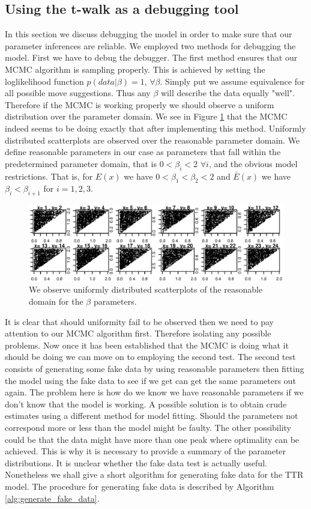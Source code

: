 \documentclass[paper=a4, fontsize=11pt]{scrartcl}
\numberwithin{equation}{section}		%
\numberwithin{figure}{section}			%
\numberwithin{table}{section}				%
\begin{document}
\subsection{Using the t-walk as a debugging tool}
In this section we discuss debugging the model in order to make sure that our parameter inferences are reliable. We employed two methods for debugging the model. First we have to debug the debugger. The first method ensures that our MCMC algorithm is sampling properly. This is achieved by setting the loglikelihood function $p(data|\beta) = 1$, $\forall \beta$. Simply put we assume equivalence for all possible move suggestions. Thus any $\beta$ will describe the data equally "well". Therefore if the MCMC is working properly we should observe a uniform distribution over the parameter domain.  We see in Figure \ref{fig:mcmc_debug_uni_dist} that the MCMC indeed seems to be doing exactly that after implementing this method.  Uniformly distributed scatterplots are observed over the reasonable parameter domain. 
We define reasonable parameters in our case as parameters that fall within the predetermined parameter domain, that is $ 0 <\beta_i < 2$  $\forall i$, and the obvious model restrictions. That is,  for $E(x)$ we have $0 <\beta_1 < \beta_2 < 2$ and $\bar{E}(x)$ we have $\beta_{i} < \beta_{i+1}$ for $i = 1,2,3$.
\begin{figure}[ht]
\centering
\includegraphics[scale=0.8]{mcmc_debug.eps}
\caption{We observe uniformly distributed scatterplots of the reasonable domain for the $\beta$ parameters.} 
\label{fig:mcmc_debug_uni_dist}
\end{figure}

It is clear that should uniformity fail to be observed then we need to pay attention to our MCMC algorithm first. Therefore isolating any possible problems.
Now once it has been established that the MCMC is doing what it should be doing we can move on to employing the second test. The second test consists of generating some fake data by using reasonable parameters then fitting the model using the fake data to see if we get can get the same parameters out again. The problem here is how do we know we have reasonable parameters if we don't know that the model is working. A possible solution is to obtain crude estimates using a different method for model fitting. Should the parameters not correspond more or less than the model might be faulty. The other possibility could be that the data might have more than one peak where optimality can be achieved. This is why it is necessary to provide a summary of the parameter distributions. It is unclear whether the fake data test is actually useful. Nonetheless we shall give a short algorithm for generating fake data for the TTR model. The procedure for generating fake data is described by Algorithm \ref{alg:generate_fake_data}.
\end{document}
